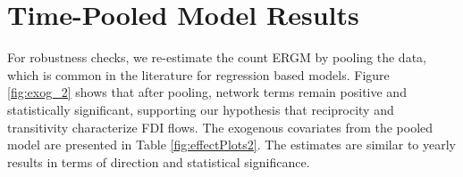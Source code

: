 \documentclass[reqno,onecolumn,letterpaper,12pt]{article}
\begin{document}


\clearpage

\section{Time-Pooled Model Results}\label{pooledresults}
For robustness checks, we re-estimate the count ERGM by pooling the data, which is common in the literature for regression based models. Figure \ref{fig:exog_2} shows that after pooling, network terms remain positive and statistically significant, supporting our hypothesis that reciprocity and transitivity characterize FDI flows. The exogenous covariates from the pooled model are presented in Table \ref{fig:effectPlots2}. The estimates are similar to yearly results in terms of direction and statistical significance. %
\end{document}
